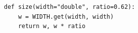 \begin{lstlisting}[firstnumber=45]
def size(width="double", ratio=0.62):
    w = WIDTH.get(width, width)
    return w, w * ratio
\end{lstlisting}
